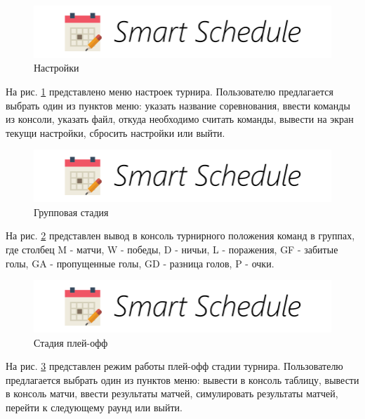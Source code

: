 \begin{figure}[H]
	\begin{center}
		\includegraphics[scale=0.8]{pics/logo}
		\caption{Настройки} 
		\label{pic:cli_settings} %
	\end{center}
\end{figure}
На рис. \ref{pic:cli_settings} представлено меню настроек турнира. Пользователю предлагается выбрать один из пунктов меню: указать название соревнования, ввести команды из консоли, указать файл, откуда необходимо считать команды, вывести на экран текущи настройки, сбросить настройки или выйти.

\begin{figure}[H]
	\begin{center}
		\includegraphics[scale=0.8]{pics/logo}
		\caption{Групповая стадия} 
		\label{pic:cli_group_stage} %
	\end{center}
\end{figure}
На рис. \ref{pic:cli_group_stage} представлен вывод в консоль турнирного положения команд в группах, где столбец M - матчи, W - победы, D - ничьи, L - поражения, GF - забитые голы, GA - пропущенные голы, GD - разница голов, P - очки.

\begin{figure}[H]
	\begin{center}
		\includegraphics[scale=0.8]{pics/logo}
		\caption{Стадия плей-офф} 
		\label{pic:cli_playoff_stage} %
	\end{center}
\end{figure}
На рис. \ref{pic:cli_playoff_stage} представлен режим работы плей-офф стадии турнира. Пользователю предлагается выбрать один из пунктов меню: вывести в консоль таблицу, вывести в консоль матчи, ввести результаты матчей, симулировать результаты матчей, перейти к следующему раунд или выйти.

